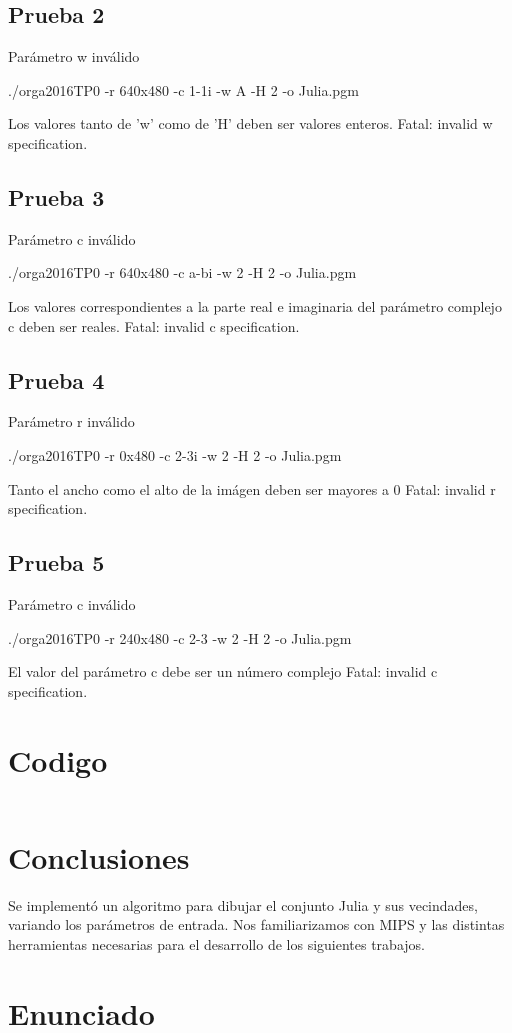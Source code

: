 \documentclass{article}
\begin{document}
\raggedright
\subsection*{Prueba 2}
Par\'ametro w inv\'alido
\begin{center}
    ./orga2016TP0 -r 640x480 -c 1-1i -w A -H 2 -o Julia.pgm\\
\end{center}
Los valores tanto de 'w' como de 'H' deben ser valores enteros.
\center
Fatal: invalid w specification.

\raggedright
\subsection*{Prueba 3}
Par\'ametro c inv\'alido
\begin{center}
    ./orga2016TP0 -r 640x480 -c a-bi -w 2 -H 2 -o Julia.pgm\\
\end{center}
Los valores correspondientes a la parte real e imaginaria del par\'ametro complejo c deben ser reales.
\center
Fatal: invalid c specification.

\raggedright
\subsection*{Prueba 4}
Par\'ametro r inv\'alido
\begin{center}
    ./orga2016TP0 -r 0x480 -c 2-3i -w 2 -H 2 -o Julia.pgm\\
\end{center}
Tanto el ancho como el alto de la im\'agen deben ser mayores a 0
\center
Fatal: invalid r specification.

\raggedright
\subsection*{Prueba 5}
Par\'ametro c inv\'alido
\begin{center}
    ./orga2016TP0 -r 240x480 -c 2-3 -w 2 -H 2 -o Julia.pgm\\
\end{center}
El valor del par\'ametro c debe ser un n\'umero complejo
\center
Fatal: invalid c specification.

\newpage
\raggedright
\section{Codigo}
\begin{lstlisting}
\end{lstlisting}

\raggedright
\section{Conclusiones}
\indent Se implement\'o un algoritmo para dibujar el conjunto Julia y sus vecindades, variando los par\'ametros de entrada. Nos familiarizamos con MIPS y las distintas herramientas necesarias para el desarrollo de los siguientes trabajos.

\section{Enunciado}

\end{document}
